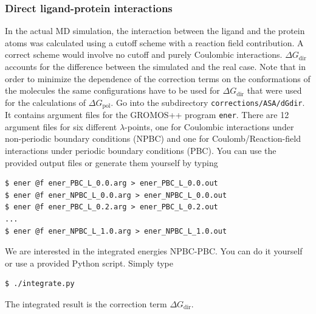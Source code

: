 \subsubsection{Direct ligand-protein interactions}
In the actual MD simulation, the interaction between the ligand and
the protein atoms was calculated using a cutoff scheme with a reaction
field contribution. A correct scheme would involve no cutoff and
purely Coulombic interactions. $\Delta
G_{\text{dir}}$ accounts for the difference between the simulated and the
real case. Note that in order to minimize the dependence of the
correction terms on the conformations of the molecules the same
configurations have to be used for $\Delta
G_{\text{dir}}$ that were used for the calculations of $\Delta
G_{\text{pol}}$. Go into the subdirectory
\texttt{corrections/ASA/dGdir}. It contains argument files for the
GROMOS++ program \texttt{ener}. There are 12 argument files for six
different $\lambda$-points,
one for Coulombic interactions under non-periodic boundary conditions
(NPBC) and one for Coulomb/Reaction-field interactions under periodic
boundary conditions (PBC). You can use the provided output files or
generate them yourself by typing
\begin{lstlisting}
$ ener @f ener_PBC_L_0.0.arg > ener_PBC_L_0.0.out
$ ener @f ener_NPBC_L_0.0.arg > ener_NPBC_L_0.0.out
$ ener @f ener_PBC_L_0.2.arg > ener_PBC_L_0.2.out
...
$ ener @f ener_NPBC_L_1.0.arg > ener_NPBC_L_1.0.out
\end{lstlisting}
%
We are interested in the integrated energies NPBC-PBC. You can do it
yourself or use a provided Python script. Simply type
\begin{lstlisting}
$ ./integrate.py 
\end{lstlisting}
The integrated result is the correction term $\Delta G_{\text{dir}}$. %


